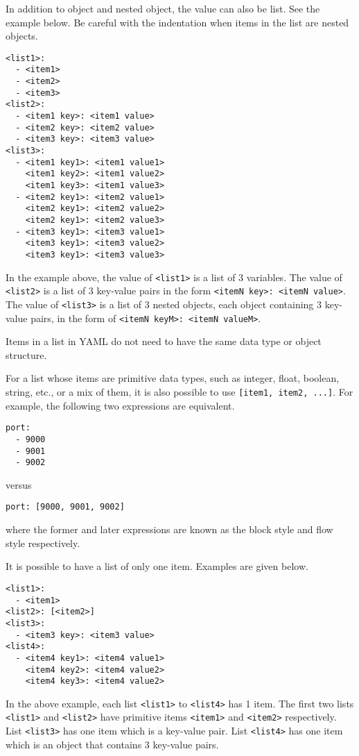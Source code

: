 In addition to object and nested object, the value can also be list. See the example below. Be careful with the indentation when items in the list are nested objects.
\begin{lstlisting}
<list1>:
  - <item1>
  - <item2>
  - <item3>
<list2>:
  - <item1 key>: <item1 value>
  - <item2 key>: <item2 value>
  - <item3 key>: <item3 value>
<list3>:
  - <item1 key1>: <item1 value1>
    <item1 key2>: <item1 value2>
    <item1 key3>: <item1 value3>
  - <item2 key1>: <item2 value1>
    <item2 key1>: <item2 value2>
    <item2 key1>: <item2 value3>
  - <item3 key1>: <item3 value1>
    <item3 key1>: <item3 value2>
    <item3 key1>: <item3 value3>
\end{lstlisting}
In the example above, the value of \verb|<list1>| is a list of 3 variables. The value of \verb|<list2>| is a list of 3 key-value pairs in the form \verb|<itemN key>: <itemN value>|. The value of \verb|<list3>| is a list of 3 nested objects, each object containing 3 key-value pairs, in the form of \verb|<itemN keyM>: <itemN valueM>|.

Items in a list in YAML do not need to have the same data type or object structure.

For a list whose items are primitive data types, such as integer, float, boolean, string, etc., or a mix of them, it is also possible to use \verb|[item1, item2, ...]|. For example, the following two expressions are equivalent.
\begin{lstlisting}
port:
  - 9000
  - 9001
  - 9002
\end{lstlisting}
versus
\begin{lstlisting}
port: [9000, 9001, 9002]
\end{lstlisting}
where the former and later expressions are known as the block style and flow style respectively.

It is possible to have a list of only one item. Examples are given below.
\begin{lstlisting}
<list1>:
  - <item1>
<list2>: [<item2>]
<list3>:
  - <item3 key>: <item3 value>
<list4>:
  - <item4 key1>: <item4 value1>
    <item4 key2>: <item4 value2>
    <item4 key3>: <item4 value2>
\end{lstlisting}
In the above example, each list \verb|<list1>| to \verb|<list4>| has 1 item. The first two lists \verb|<list1>| and \verb|<list2>| have primitive items \verb|<item1>| and \verb|<item2>| respectively. List \verb|<list3>| has one item which is a key-value pair. List \verb|<list4>| has one item which is an object that contains 3 key-value pairs.

